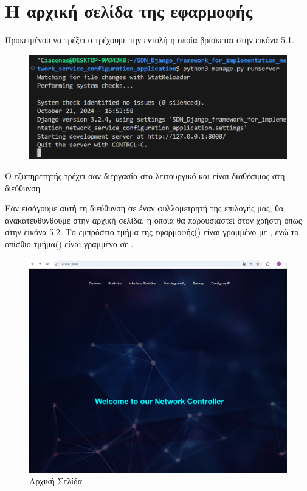 \section{Η αρχική σελίδα της εφαρμοφής}

Προκειμένου να τρέξει ο 
τρέχουμε την εντολή η οποία βρίσκεται στην 
εικόνα 5.1.

\begin{figure}[h]
	\centering
	\includegraphics[width=1.0\textwidth]{graphics/django_server_run.png}
	\caption{ }
\end{figure}






Ο εξυπηρετητής τρέχει σαν διεργασία στο λειτουργικό
και είναι διαθέσιμος στη διεύθυνση 

Εάν εισάγουμε αυτή τη διεύθυνση σε έναν 
φυλλομετρητή της επιλογής μας, θα ανακατευθυνθούμε 
στην αρχική σελίδα, η οποία θα παρουσιαστεί στον 
χρήστη όπως στην εικόνα 5.2. Το εμπρόστιο τμήμα της εφαρμοφής() 
είναι γραμμένο με , ενώ το οπίσθιο τμήμα() 
είναι γραμμένο σε .

\begin{figure}[h]
	\centering
	\includegraphics[width=1.2\textwidth]{graphics/home_page.png}
	\caption{ Αρχική Σελίδα}
\end{figure}

